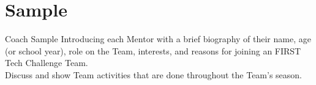 \section {Sample}
Coach Sample Introducing each Mentor with a brief  biography of their name, age (or school year), role on the Team, interests, and reasons for joining an FIRST Tech Challenge Team.\\
Discuss and show Team activities that are done throughout the Team’s season.